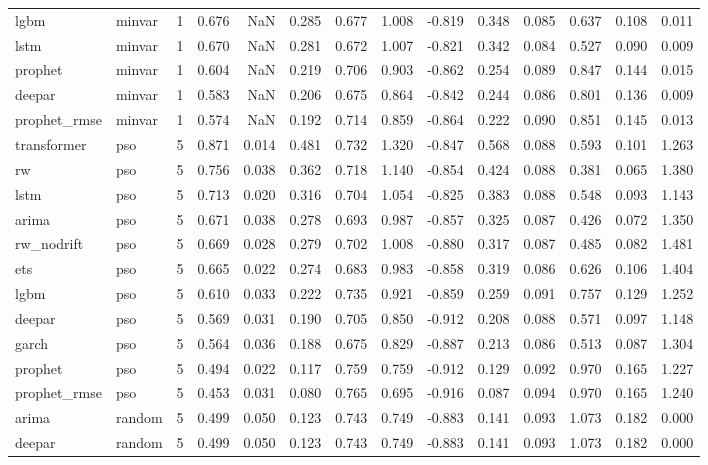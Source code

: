 \begin{table}
\begin{tabular}{llrrrrrrrrrrrr}
lgbm & minvar & 1 & 0.676 & NaN & 0.285 & 0.677 & 1.008 & -0.819 & 0.348 & 0.085 & 0.637 & 0.108 & 0.011 \\
lstm & minvar & 1 & 0.670 & NaN & 0.281 & 0.672 & 1.007 & -0.821 & 0.342 & 0.084 & 0.527 & 0.090 & 0.009 \\
prophet & minvar & 1 & 0.604 & NaN & 0.219 & 0.706 & 0.903 & -0.862 & 0.254 & 0.089 & 0.847 & 0.144 & 0.015 \\
deepar & minvar & 1 & 0.583 & NaN & 0.206 & 0.675 & 0.864 & -0.842 & 0.244 & 0.086 & 0.801 & 0.136 & 0.009 \\
prophet\_rmse & minvar & 1 & 0.574 & NaN & 0.192 & 0.714 & 0.859 & -0.864 & 0.222 & 0.090 & 0.851 & 0.145 & 0.013 \\
transformer & pso & 5 & 0.871 & 0.014 & 0.481 & 0.732 & 1.320 & -0.847 & 0.568 & 0.088 & 0.593 & 0.101 & 1.263 \\
rw & pso & 5 & 0.756 & 0.038 & 0.362 & 0.718 & 1.140 & -0.854 & 0.424 & 0.088 & 0.381 & 0.065 & 1.380 \\
lstm & pso & 5 & 0.713 & 0.020 & 0.316 & 0.704 & 1.054 & -0.825 & 0.383 & 0.088 & 0.548 & 0.093 & 1.143 \\
arima & pso & 5 & 0.671 & 0.038 & 0.278 & 0.693 & 0.987 & -0.857 & 0.325 & 0.087 & 0.426 & 0.072 & 1.350 \\
rw\_nodrift & pso & 5 & 0.669 & 0.028 & 0.279 & 0.702 & 1.008 & -0.880 & 0.317 & 0.087 & 0.485 & 0.082 & 1.481 \\
ets & pso & 5 & 0.665 & 0.022 & 0.274 & 0.683 & 0.983 & -0.858 & 0.319 & 0.086 & 0.626 & 0.106 & 1.404 \\
lgbm & pso & 5 & 0.610 & 0.033 & 0.222 & 0.735 & 0.921 & -0.859 & 0.259 & 0.091 & 0.757 & 0.129 & 1.252 \\
deepar & pso & 5 & 0.569 & 0.031 & 0.190 & 0.705 & 0.850 & -0.912 & 0.208 & 0.088 & 0.571 & 0.097 & 1.148 \\
garch & pso & 5 & 0.564 & 0.036 & 0.188 & 0.675 & 0.829 & -0.887 & 0.213 & 0.086 & 0.513 & 0.087 & 1.304 \\
prophet & pso & 5 & 0.494 & 0.022 & 0.117 & 0.759 & 0.759 & -0.912 & 0.129 & 0.092 & 0.970 & 0.165 & 1.227 \\
prophet\_rmse & pso & 5 & 0.453 & 0.031 & 0.080 & 0.765 & 0.695 & -0.916 & 0.087 & 0.094 & 0.970 & 0.165 & 1.240 \\
arima & random & 5 & 0.499 & 0.050 & 0.123 & 0.743 & 0.749 & -0.883 & 0.141 & 0.093 & 1.073 & 0.182 & 0.000 \\
deepar & random & 5 & 0.499 & 0.050 & 0.123 & 0.743 & 0.749 & -0.883 & 0.141 & 0.093 & 1.073 & 0.182 & 0.000 \\

\end{tabular}
\end{table}
